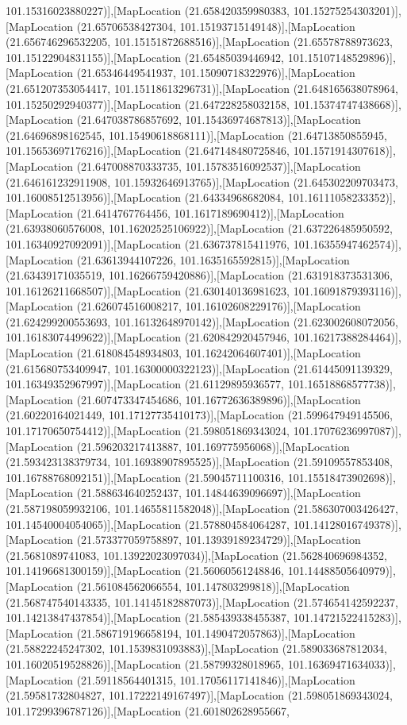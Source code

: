 101.15316023880227)],[MapLocation (21.658420359980383, 101.15275254303201)],[MapLocation (21.65706538427304, 101.15193715149148)],[MapLocation (21.656746296532205, 101.15151872688516)],[MapLocation (21.65578788973623, 101.15122904831155)],[MapLocation (21.65485039446942, 101.15107148529896)],[MapLocation (21.65346449541937, 101.15090718322976)],[MapLocation (21.651207353054417, 101.15118613296731)],[MapLocation (21.648165638078964, 101.15250292940377)],[MapLocation (21.647228258032158, 101.15374747438668)],[MapLocation (21.647038786857692, 101.15436974687813)],[MapLocation (21.64696898162545, 101.15490618868111)],[MapLocation (21.64713850855945, 101.15653697176216)],[MapLocation (21.647148480725846, 101.1571914307618)],[MapLocation (21.647008870333735, 101.15783516092537)],[MapLocation (21.646161232911908, 101.15932646913765)],[MapLocation (21.645302209703473, 101.16008512513956)],[MapLocation (21.64334968682084, 101.16111058233352)],[MapLocation (21.6414767764456, 101.1617189690412)],[MapLocation (21.63938060576008, 101.16202525106922)],[MapLocation (21.637226485950592, 101.16340927092091)],[MapLocation (21.636737815411976, 101.16355947462574)],[MapLocation (21.63613944107226, 101.1635165592815)],[MapLocation (21.63439171035519, 101.16266759420886)],[MapLocation (21.631918373531306, 101.16126211668507)],[MapLocation (21.630140136981623, 101.16091879393116)],[MapLocation (21.626074516008217, 101.16102608229176)],[MapLocation (21.624299200553693, 101.16132648970142)],[MapLocation (21.623002608072056, 101.16183074499622)],[MapLocation (21.620842920457946, 101.16217388284464)],[MapLocation (21.618084548934803, 101.16242064607401)],[MapLocation (21.615680753409947, 101.16300000322123)],[MapLocation (21.61445091139329, 101.16349352967997)],[MapLocation (21.61129895936577, 101.16518868577738)],[MapLocation (21.607473347454686, 101.16772636389896)],[MapLocation (21.60220164021449, 101.17127735410173)],[MapLocation (21.599647949145506, 101.17170650754412)],[MapLocation (21.598051869343024, 101.17076236997087)],[MapLocation (21.596203217413887, 101.169775956068)],[MapLocation (21.593423138379734, 101.16938907895525)],[MapLocation (21.59109557853408, 101.16788768092151)],[MapLocation (21.59045711100316, 101.15518473902698)],[MapLocation (21.588634640252437, 101.14844639096697)],[MapLocation (21.587198059932106, 101.14655811582048)],[MapLocation (21.586307003426427, 101.14540004054065)],[MapLocation (21.578804584064287, 101.14128016749378)],[MapLocation (21.573377059758897, 101.13939189234729)],[MapLocation (21.5681089741083, 101.13922023097034)],[MapLocation (21.562840696984352, 101.14196681300159)],[MapLocation (21.56060561248846, 101.14488505640979)],[MapLocation (21.561084562066554, 101.147803299818)],[MapLocation (21.568747540143335, 101.14145182887073)],[MapLocation (21.574654142592237, 101.14213847437854)],[MapLocation (21.585439338455387, 101.14721522415283)],[MapLocation (21.586719196658194, 101.1490472057863)],[MapLocation (21.58822245247302, 101.1539831093883)],[MapLocation (21.589033687812034, 101.16020519528826)],[MapLocation (21.58799328018965, 101.16369471634033)],[MapLocation (21.59118564401315, 101.17056117141846)],[MapLocation (21.59581732804827, 101.17222149167497)],[MapLocation (21.598051869343024, 101.17299396787126)],[MapLocation (21.601802628955667, 